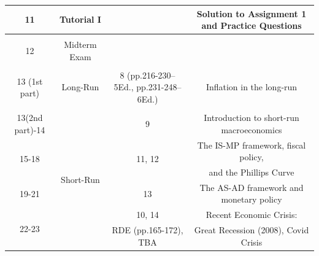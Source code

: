\documentclass[letterpaper,12pt]{article}
\theoremstyle{dotlessS}
\begin{document}
\begin{table}[!h]
\begin{minipage}[h]{1\textwidth}
{\begin{tabular}{|c|c|c|c|}
11                                 & Tutorial I                                           &                                                 & Solution to Assignment 1 and Practice Questions       \\[1.4ex]
\hline
						&									&                                                  &                                                          \\
12                             & Midterm Exam                                     &                                    &                  \\[1.4ex]
\hline
			                      			&						                                &                                              &                                                          \\
13 (1st part)                         & Long-Run                                                       & 8 (pp.216-230-- 5Ed., pp.231-248-- 6Ed.)                          &Inflation in the long-run     \\[1.4ex]						\hline
			                      			&						                                &                                              &                                                          \\
13(2nd part)-14                           &   \multirow{ 6}{*}{Short-Run}          & 9                                           & Introduction to short-run macroeconomics \\[3ex]
\multirow{ 2}{*}{15-18}				&									       &\multirow{ 2}{*}{11, 12}                                    & The IS-MP framework, fiscal policy,  \\   
                                                        &                                                              &                                                                            & and the Phillips Curve \\  [3ex]        
19-21      				&									&13                                         &The AS-AD framework and monetary policy            \\[3ex]
\multirow{ 2}{*}{22-23}                                 &                  &   10, 14                                            & Recent Economic Crisis:                                   \\
                                                                  &                  &  RDE (pp.165-172), TBA                                           &  Great Recession (2008), Covid Crisis                                                     \\[1.4ex]

\end{tabular}}
\end{minipage}
\end{table}
\end{document}
